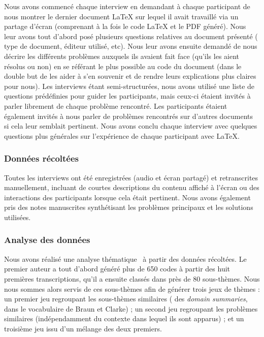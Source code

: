 Nous avons commencé chaque interview en demandant à chaque participant de nous montrer le dernier document \LaTeX{} sur lequel il avait travaillé via un partage d'écran (comprenant à la fois le code \LaTeX{} et le PDF généré).
Nous leur avons tout d'abord posé plusieurs questions relatives au document présenté (\eg{} type de document, éditeur utilisé, etc).
Nous leur avons ensuite demandé de nous décrire les différents problèmes auxquels ils avaient fait face (qu'ils les aient résolus ou non) en se référant le plus possible au code du document (dans le double but de les aider à s'en souvenir et de rendre leurs explications plus claires pour nous).
Les interviews étant semi-structurées, nous avons utilisé une liste de questions prédéfinies pour guider les participants, mais ceux-ci étaient invités à parler librement de chaque problème rencontré.
Les participants étaient également invités à nous parler de problèmes rencontrés sur d'autres documents si cela leur semblait pertinent.
Nous avons conclu chaque interview avec quelques questions plus générales sur l'expérience de chaque participant avec \LaTeX{}.

\subsubsection{Données récoltées}
Toutes les interviews ont été enregistrées (audio et écran partagé) et retranscrites manuellement, incluant de courtes descriptions du contenu affiché à l'écran ou des interactions des participants lorsque cela était pertinent.
Nous avons également pris des notes manuscrites synthétisant les problèmes principaux et les solutions utilisées.

\subsubsection{Analyse des données}
\label{sssec:collecte-analyse-donnees}
Nous avons réalisé une analyse thématique~\cite{braun2019reflecting} à partir des données récoltées.
Le premier auteur a tout d'abord généré plus de 650 codes à partir des huit premières transcriptions, qu'il a ensuite classés dans près de 80 sous-thèmes.
Nous nous sommes alors servis de ces sous-thèmes afin de générer trois jeux de thèmes :
un premier jeu regroupant les sous-thèmes similaires (\ie{} des \emph{domain summaries}, dans le vocabulaire de Braun et Clarke) ;
un second jeu regroupant les problèmes similaires (indépendamment du contexte dans lequel ils sont apparus) ;
et un troisième jeu issu d'un mélange des deux premiers.

